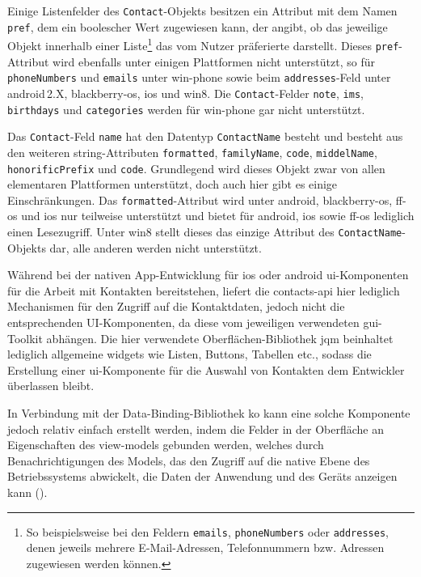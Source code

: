 Einige Listenfelder des \lstinline|Contact|-Objekts besitzen ein Attribut mit dem Namen \lstinline|pref|, dem ein boolescher Wert zugewiesen kann, der angibt, ob das jeweilige Objekt innerhalb einer Liste\footnote{So beispielsweise bei den Feldern \lstinline|emails|, \lstinline|phoneNumbers| oder \lstinline|addresses|, denen jeweils mehrere E-Mail-Adressen, Telefonnummern bzw. Adressen zugewiesen werden können.} das vom Nutzer präferierte darstellt.
Dieses \lstinline|pref|-Attribut wird ebenfalls unter einigen Plattformen nicht unterstützt, so \zB für \lstinline|phoneNumbers| und \lstinline|emails| unter \gls{win-phone} sowie beim \lstinline|addresses|-Feld unter \gls{android}\,2.X, \gls{blackberry-os}, \gls{ios} und \gls{win8}.
Die \lstinline|Contact|-Felder \mbox{\lstinline|note|,} \mbox{\lstinline|ims|,} \lstinline|birthdays| und \lstinline|categories| werden für \gls{win-phone} gar nicht unterstützt.

Das \og \lstinline|Contact|-Feld \lstinline|name| hat den Datentyp \lstinline|ContactName| besteht und besteht aus den weiteren \gls{string}-Attributen \mbox{\lstinline|formatted|,} \mbox{\lstinline|familyName|,} \mbox{\lstinline|code|,} \mbox{\lstinline|middelName|,} \lstinline|honorificPrefix| und \lstinline|code|.
Grundlegend wird dieses Objekt zwar von allen elementaren Plattformen unterstützt, doch auch hier gibt es einige Einschränkungen.
Das \lstinline|formatted|-Attribut wird unter \gls{android}, \gls{blackberry-os}, \gls{ff-os} und \gls{ios} nur teilweise unterstützt und bietet für \gls{android}, \gls{ios} sowie \gls{ff-os} lediglich einen Lesezugriff.
Unter \gls{win8} stellt dieses das einzige Attribut des \lstinline|ContactName|-Objekts dar, alle anderen werden nicht unterstützt.

Während bei der nativen App-Entwicklung für \gls{ios} oder \gls{android} \gls{ui}-Kom\-po\-nen\-ten für die Arbeit mit Kontakten bereitstehen, liefert die \gls{contacts-api} hier lediglich Mechanismen für den Zugriff auf die Kontaktdaten, jedoch nicht die entsprechenden UI-Komponenten, da diese vom jeweiligen verwendeten \gls{gui}-Toolkit abhängen.
Die hier verwendete Oberflächen-Bibliothek \gls{jqm} beinhaltet lediglich allgemeine \glspl{widget} wie Listen, Buttons, Tabellen etc., sodass die Erstellung einer \gls{ui}-Komponente für die Auswahl von Kontakten dem Entwickler überlassen bleibt.

In Verbindung mit der Data-Binding-Bibliothek \gls{ko} kann eine solche Komponente jedoch relativ einfach erstellt werden, indem die Felder in der Oberfläche an Eigenschaften des \glspl{view-model} gebunden werden, welches durch Benachrichtigungen des Models, das den Zugriff auf die native Ebene des Betriebssystems abwickelt, die Daten der Anwendung und des Geräts anzeigen kann ().

